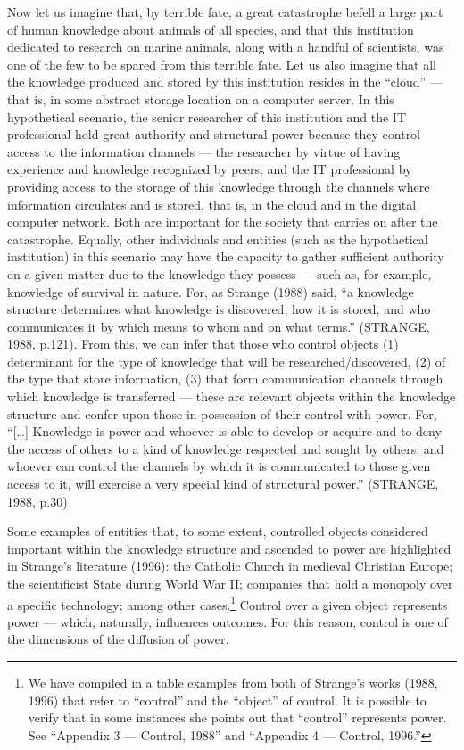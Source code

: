 Now let us imagine that, by terrible fate, a great catastrophe befell a large part of human knowledge about animals of all species, and that this institution dedicated to research on marine animals, along with a handful of scientists, was one of the few to be spared from this terrible fate. Let us also imagine that all the knowledge produced and stored by this institution resides in the ``cloud'' --- that is, in some abstract storage location on a computer server. In this hypothetical scenario, the senior researcher of this institution and the IT professional hold great authority and structural power because they control access to the information channels --- the researcher by virtue of having experience and knowledge recognized by peers; and the IT professional by providing access to the storage of this knowledge through the channels where information circulates and is stored, that is, in the cloud and in the digital computer network. Both are important for the society that carries on after the catastrophe. Equally, other individuals and entities (such as the hypothetical institution) in this scenario may have the capacity to gather sufficient authority on a given matter due to the knowledge they possess --- such as, for example, knowledge of survival in nature. For, as Strange (1988) said, ``a knowledge structure determines what knowledge is discovered, how it is stored, and who communicates it by which means to whom and on what terms.'' (STRANGE, 1988, p.121). From this, we can infer that those who control objects (1) determinant for the type of knowledge that will be researched/discovered, (2) of the type that store information, (3) that form communication channels through which knowledge is transferred --- these are relevant objects within the knowledge structure and confer upon those in possession of their control with power. For, ``{[}\ldots{]} Knowledge is power and whoever is able to develop or acquire and to deny the access of others to a kind of knowledge respected and sought by others; and whoever can control the channels by which it is communicated to those given access to it, will exercise a very special kind of structural power.'' (STRANGE, 1988, p.30)

Some examples of entities that, to some extent, controlled objects considered important within the knowledge structure and ascended to power are highlighted in Strange's literature (1996): the Catholic Church in medieval Christian Europe; the scientificist State during World War II; companies that hold a monopoly over a specific technology; among other cases.\footnote{We have compiled in a table examples from both of Strange's works (1988, 1996) that refer to ``control'' and the ``object'' of control. It is possible to verify that in some instances she points out that ``control'' represents power. See ``Appendix 3 --- Control, 1988'' and ``Appendix 4 --- Control, 1996.''} Control over a given object represents power --- which, naturally, influences outcomes. For this reason, control is one of the dimensions of the diffusion of power.

